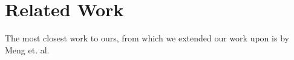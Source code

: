 \section{Related Work}

The most closest work to ours, from which we extended our work upon is by Meng et. al.~\cite{meng_vcacheshare:_2014}
